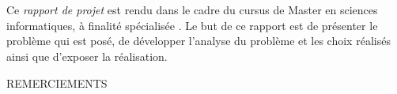 \documentclass[12pt, a4paper, oneside, titlepage]{book}%
\begin{document}
\chapter*{}
Ce \emph{rapport de projet} est rendu dans le cadre du cursus de \og Master en sciences informatiques, à finalité spécialisée \fg. Le but de ce rapport est de présenter le problème qui est posé, de développer l'analyse du problème et les choix réalisés ainsi que d'exposer la réalisation.

\cleardoublepage
\newpage
\thispagestyle{empty}
REMERCIEMENTS



\newpage
\thispagestyle{empty}
\tableofcontents
      
\end{document}

